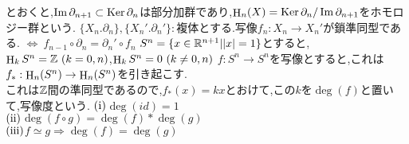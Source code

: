 とおくと,$\mathop{\mathrm{Im}}\nolimits \partial_{n+1} \subset \mathop{\mathrm{Ker}}\nolimits \partial_{n}$は部分加群であり,$\mathop{\mathrm{H}}\nolimits_n(X) = \mathop{\mathrm{Ker}}\nolimits \partial_{n}/ \mathop{\mathrm{Im}}\nolimits \partial_{n+1} $をホモロジー群という.
{}
$\{X_n.\partial_n\},\{X_n'.\partial_n'\}:$複体とする.写像$f_n :X_n \to X_n'$が鎖準同型である.
$\iff\ f_{n-1}\circ\partial_n = \partial_n'\circ f_n$
\thm
$S^n=\{x\in\mathbb R^{n+1} | |x|=1\}$とすると,$\mathop{\mathrm{H}}\nolimits_k S^n = \mathbb Z\  (k=0,n)$,$\mathop{\mathrm{H}}\nolimits_k S^n = 0\  (k\neq 0,n)$
\thmx
\thm
$f:S^n \to S^n$を写像とすると,これは$f_*:\mathop{\mathrm{H}}\nolimits_n(S^n)\to \mathop{\mathrm{H}}\nolimits_n(S^n)$を引き起こす.\\
これは$\mathbb Z$間の準同型であるので,$f_*(x) = kx$とおけて,この$k$を$\deg(f)$と置いて,写像度という.
\thmx
\prop
$\rm (i)$$\deg(id)=1$\\
$\rm (ii)$$\deg(f\circ g) = \deg(f)*\deg(g)$\\
$\rm (iii)$$f \simeq g \Rightarrow \deg(f) = \deg(g)$\\
\propx


